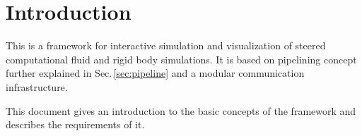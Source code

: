 \section{Introduction}
This is a framework for interactive simulation and visualization of
steered computational fluid and rigid body simulations.
It is based on pipelining concept further explained in Sec.\,\ref{sec:pipeline}
and a modular communication infrastructure.

This document gives an introduction to the basic concepts of the framework and
describes the requirements of it.